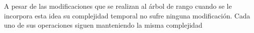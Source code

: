 A pesar de las modificaciones que se realizan al árbol de rango cuando se le incorpora esta idea su complejidad temporal no sufre ninguna modificación. Cada uno de sus operaciones siguen manteniendo la misma complejidad
